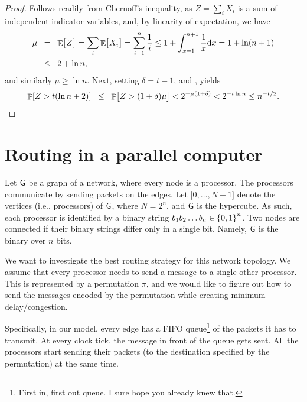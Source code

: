 \begin{proof}
    Follows readily from Chernoff's inequality, as $Z=\sum_i X_i$ is a
    sum of independent indicator variables, and, by linearity of
    expectation, we have
    \begin{align*}
        \mu%
        &\EQ%
        \Ex{\bigl. Z}%
        =%
        \sum_i \Ex{\big. X_i}%
        =%
        \sum_{i=1}^n \frac{1}{i}%
        \leq%
        1 + \int_{x=1}^{n+1} \frac{1}{x} \mathrm{d}x%
        =%
        1 + \ln (n+1)
        \\&\LEQ
        2 + \ln n,
    \end{align*}
    and similarly $\mu \geq \ln n$.  Next, setting $\delta = t-1$, and 
    , yields
    \begin{equation*}
        \Prob{ Z > t( \ln n+2)}
        \LEQ 
        \Prob{ \bigl. Z > (1+\delta)\mu } < 2^{-\mu (1 + \delta)}
        <%
        2^{-t \ln n}
        \leq
        n^{-t/2 }.
    \end{equation*}
\end{proof}


\section{Routing in a parallel computer}


Let $\mathsf{G}$ be a graph of a network, where every node is a processor.
The processors communicate by sending packets on the edges. Let
$\bigl[0, \ldots, N -1 \bigr]$ denote the vertices (i.e., processors)
of $\mathsf{G}$, where $N = 2^n$, and $\mathsf{G}$ is the hypercube. As such,
each processor is identified by a binary string
$b_1b_2\ldots b_n \in \left\{ {0,1} \right\}^n$. Two nodes are connected if their
binary strings differ only in a single bit. Namely, $\mathsf{G}$ is the
binary  over $n$ bits.

We want to investigate the best routing strategy for this network
topology. We assume that every processor needs to send a message to a
single other processor. This is represented by a permutation $\pi$,
and we would like to figure out how to send the messages encoded by
the permutation while creating minimum delay/congestion.

Specifically, in our model, every edge has a FIFO queue\footnote{First
   in, first out queue. I sure hope you already knew that.} of the
packets it has to transmit. At every clock tick, the message in front
of the queue gets sent. All the processors start sending their packets
(to the destination specified by the permutation) at the same time.

